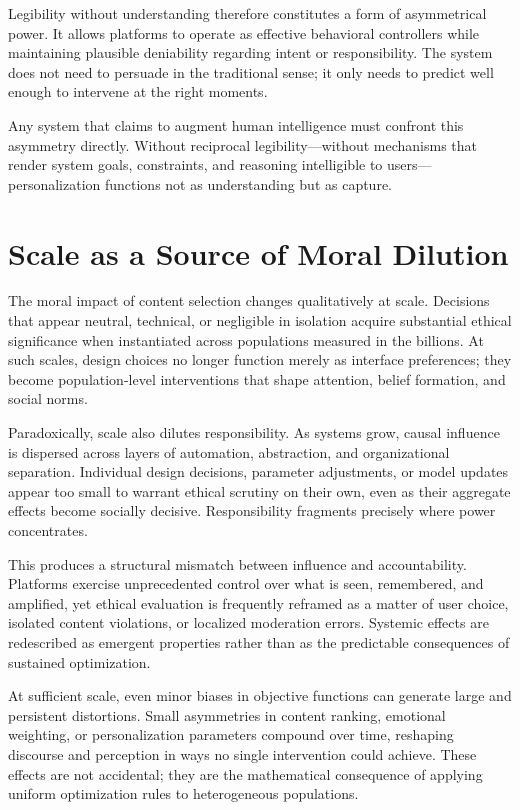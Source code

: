 \documentclass[12pt]{article}
\begin{document}
Legibility without understanding therefore constitutes a form of asymmetrical power. It allows platforms to operate as effective behavioral controllers while maintaining plausible deniability regarding intent or responsibility. The system does not need to persuade in the traditional sense; it only needs to predict well enough to intervene at the right moments.

Any system that claims to augment human intelligence must confront this asymmetry directly. Without reciprocal legibility—without mechanisms that render system goals, constraints, and reasoning intelligible to users—personalization functions not as understanding but as capture.

\section{Scale as a Source of Moral Dilution}

The moral impact of content selection changes qualitatively at scale. Decisions that appear neutral, technical, or negligible in isolation acquire substantial ethical significance when instantiated across populations measured in the billions. At such scales, design choices no longer function merely as interface preferences; they become population-level interventions that shape attention, belief formation, and social norms.

Paradoxically, scale also dilutes responsibility. As systems grow, causal influence is dispersed across layers of automation, abstraction, and organizational separation. Individual design decisions, parameter adjustments, or model updates appear too small to warrant ethical scrutiny on their own, even as their aggregate effects become socially decisive. Responsibility fragments precisely where power concentrates.

This produces a structural mismatch between influence and accountability. Platforms exercise unprecedented control over what is seen, remembered, and amplified, yet ethical evaluation is frequently reframed as a matter of user choice, isolated content violations, or localized moderation errors. Systemic effects are redescribed as emergent properties rather than as the predictable consequences of sustained optimization.

At sufficient scale, even minor biases in objective functions can generate large and persistent distortions. Small asymmetries in content ranking, emotional weighting, or personalization parameters compound over time, reshaping discourse and perception in ways no single intervention could achieve. These effects are not accidental; they are the mathematical consequence of applying uniform optimization rules to heterogeneous populations.
\end{document}
